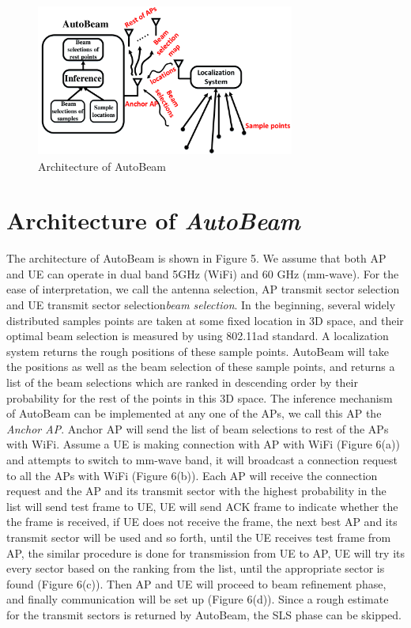 \documentclass[conference]{IEEEtran}
\begin{document}
\begin{figure}[t!]
	\centerline{\includegraphics[width=8.5cm,height=5cm]{architecture1}}
	\caption[U-example]{Architecture of AutoBeam}
\end{figure}
\section{Architecture of \emph{AutoBeam}}
The architecture of AutoBeam is shown in Figure 5. We assume that both AP and UE can operate in dual band 5GHz (WiFi) and 60 GHz (mm-wave). For the ease of interpretation, we call the antenna selection, AP transmit sector selection and UE transmit sector selection\emph{beam selection}. In the beginning, several widely distributed samples points are taken at some fixed location in 3D space, and their optimal beam selection is measured by using 802.11ad standard. A localization system returns the rough positions of these sample points. %
AutoBeam will take the positions as well as the beam selection of these sample points, and returns a list of the beam selections which are ranked in descending order by their probability for the rest of the points in this 3D space. %
The inference mechanism of AutoBeam can be implemented at any one of the APs, we call this AP the \emph{Anchor AP}. Anchor AP will send the list of beam selections to rest of the APs with WiFi. Assume a UE is making connection with AP with WiFi (Figure 6(a)) and attempts to switch to mm-wave band, it will broadcast a connection request to all the APs with WiFi (Figure 6(b)). Each AP will receive the connection request and the AP and its transmit sector with the highest probability in the list will send test frame to UE, UE will send ACK frame to indicate whether the the frame is received, if UE does not receive the frame, the next best AP and its transmit sector will be used and so forth, until the UE receives test frame from AP, the similar procedure is done for transmission from UE to AP, UE will try its every sector based on the ranking from the list, until the appropriate sector is found (Figure 6(c)). Then AP and UE will proceed to beam refinement phase, and finally communication will be set up (Figure 6(d)). Since a rough estimate for the transmit sectors is returned by AutoBeam, the SLS phase can be skipped.   
\end{document}
